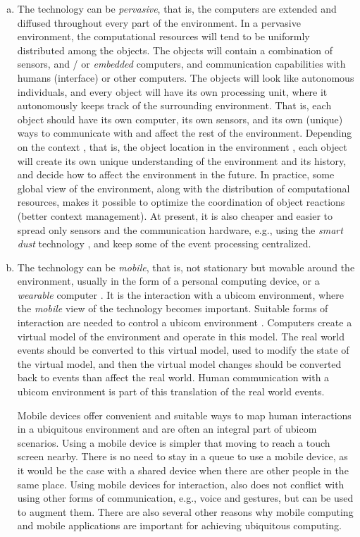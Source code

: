 \begin{enumerate}[a.]

\item The technology can be \textit{pervasive}, that is, the computers are extended and diffused throughout every part of the environment. In a pervasive environment, the computational resources will tend to be uniformly distributed among the objects. The objects will contain a combination of sensors, and / or \textit{embedded} computers, and communication capabilities with humans (interface) or other computers. The objects will look like autonomous individuals, and every object will have its own processing unit, where it autonomously keeps track of the surrounding environment. That is, each object should have its own computer, its own sensors, and its own (unique) ways to communicate with and affect the rest of the environment. Depending on the context \cite{schilit94contextaware}, that is, the object location in the environment \cite{hightower01survey}, each object will create its own unique understanding of the environment and its history, and decide how to affect the environment in the future. In practice, some global view of the environment, along with the distribution of computational resources, makes it possible to optimize the coordination of object reactions (better context management). At present, it is also cheaper and easier to spread only sensors and the communication hardware, e.g., using the \textit{smart dust} technology \cite{kahn99next,warneke01smart}, and keep some of the event processing centralized.

\item The technology can be \textit{mobile}, that is, not stationary but movable around the environment, usually in the form of a personal computing device, or a \textit{wearable} computer \cite{wearable.1998}. It is the interaction with a ubicom environment, where the \textit{mobile} view of the technology becomes important. Suitable forms of interaction are needed to control a ubicom environment \cite{tochi-millenium}. Computers create a virtual model of the environment and operate in this model. The real world events should be converted to this virtual model, used to modify the state of the virtual model, and then the virtual model changes should be converted back to events than affect the real world. Human communication with a ubicom environment is part of this translation of the real world events.

Mobile devices offer convenient and suitable ways to map human interactions in a ubiquitous environment and are often an integral part of ubicom scenarios. Using a mobile device is simpler that moving to reach a touch screen nearby. There is no need to stay in a queue to use a mobile device, as it would be the case with a shared device when there are other people in the same place. Using mobile devices for interaction, also does not conflict with using other forms of communication, e.g., voice and gestures, but can be used to augment them.
%
There are also several other reasons why mobile computing and mobile applications are important for achieving ubiquitous computing. 


\end{enumerate}
